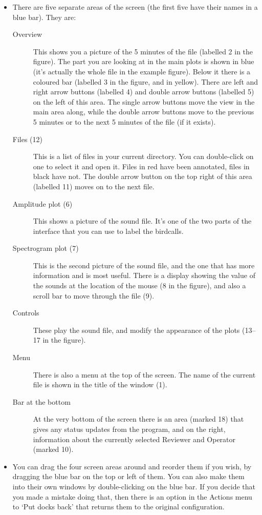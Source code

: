 \documentclass{article}
\begin{document}
\newpage
\begin{itemize}
\item There are five separate areas of the screen (the first five have their names in a blue bar). They are:
	\begin{description}
	\item[Overview] This shows you a picture of the 5 minutes of the file (labelled 2 in the figure). The part you are looking at in the main plots is shown in blue (it's actually the whole file in the example figure). Below it there is a coloured bar (labelled 3 in the figure, and in yellow). There are left and right arrow buttons (labelled 4) and double arrow buttons (labelled 5) on the left of this area. The single arrow buttons move the view in the main area along, while the double arrow buttons move to the previous 5 minutes or to the next 5 minutes of the file (if it exists). 
	\item [Files (12)] This is a list of files in your current directory. You can double-click on one to select it and open it. Files in red have been annotated, files in black have not. The double arrow button on the top right of this area (labelled 11) moves on to the next file.
	\item[Amplitude plot (6)] This shows a picture of the sound file. It's one of the two parts of the interface that you can use to label the birdcalls. 
	\item[Spectrogram plot (7)] This is the second picture of the sound file, and the one that has more information and is most useful. There is a display showing the value of the sounds at the location of the mouse (8 in the figure), and also a scroll bar to move through the file (9). 
		\item[Controls] These play the sound file, and modify the appearance of the plots (13--17 in the figure).
	\item[Menu] There is also a menu at the top of the screen. The name of the current file is shown in the title of the window (1).
	\item[Bar at the bottom] At the very bottom of the screen there is an area (marked 18) that gives any status updates from the program, and on the right, information about the currently selected Reviewer and Operator (marked 10).
	\end{description}

\item You can drag the four screen areas around and reorder them if you wish, by dragging the blue bar on the top or left of them. You can also make them into their own windows by double-clicking on the blue bar. If you decide that you made a mistake doing that, then there is an option in the Actions menu to `Put docks back' that returns them to the original configuration.


\end{itemize}
\end{document}
